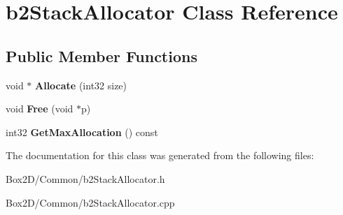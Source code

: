 \hypertarget{classb2_stack_allocator}{}\section{b2\+Stack\+Allocator Class Reference}
\label{classb2_stack_allocator}
\subsection*{Public Member Functions}
\begin{DoxyCompactItemize}
\item 
\mbox{\label{classb2_stack_allocator_a4b8c515d8e1a1c2d5b151c3a2f96fa19}} 
void $\ast$ {\bfseries Allocate} (int32 size)
\item 
\mbox{\label{classb2_stack_allocator_a3a4384cf5f467828db3022985673db66}} 
void {\bfseries Free} (void $\ast$p)
\item 
\mbox{\label{classb2_stack_allocator_a9670b9ce67f939004f227d1be883404f}} 
int32 {\bfseries Get\+Max\+Allocation} () const
\end{DoxyCompactItemize}


The documentation for this class was generated from the following files\+:\begin{DoxyCompactItemize}
\item 
Box2\+D/\+Common/b2\+Stack\+Allocator.\+h\item 
Box2\+D/\+Common/b2\+Stack\+Allocator.\+cpp\end{DoxyCompactItemize}
